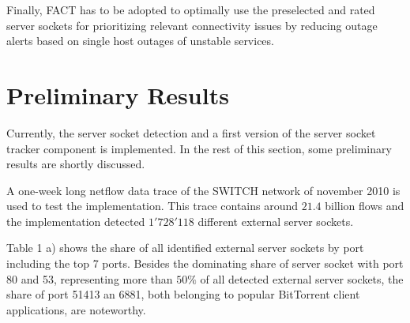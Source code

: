 \documentclass{sigcomm-alternate}
\begin{document}
Finally, FACT has to be adopted to optimally use the preselected and rated 
server sockets for prioritizing relevant connectivity issues by reducing 
outage alerts based on single host outages of unstable services.

\section{Preliminary Results} 
Currently, the server socket detection and a first version of the 
server socket tracker component is implemented. In the 
rest of this section, some preliminary results are shortly discussed. 

A one-week long netflow data trace of the SWITCH network of november 2010 is used to test the
implementation. This trace contains around $21.4$ billion flows and
the implementation detected $1'728'118$ different external server sockets.

Table 1 a) shows the share of all identified external server sockets by port including the top 7 ports. Besides the dominating share
of server socket with port 80 and 53, representing more than $50\%$ of all detected external server sockets,
the share of port 51413 an 6881, both belonging to popular BitTorrent client applications, are noteworthy. 
\end{document}
